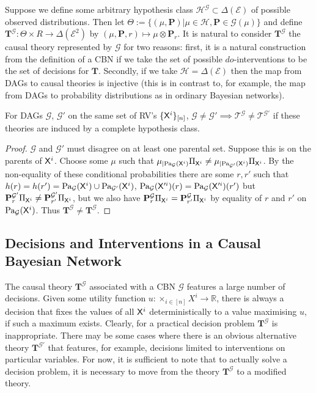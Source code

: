 Suppose we define some arbitrary hypothesis class $\mathscr{H}^{\mathcal{G}}\subset\Delta(\mathcal{E})$ of possible observed distributions. Then let $\Theta:=\{(\mu,\mathbf{P})|\mu\in\mathscr{H},\mathbf{P}\in \mathcal{G}(\mu)\}$ and define $\mathbf{T}^\mathscr{G}:\Theta\times R \to \Delta(\mathcal{E}^2)$ by $(\mu,\mathbf{P},r)\mapsto \mu\otimes \mathbf{P}_r$. It is natural to consider $\mathbf{T}^\mathscr{G}$ the causal theory represented by $\mathcal{G}$ for two reasons: first, it is a natural construction from the definition of a CBN if we take the set of possible $do$-interventions to be the set of decisions for $\mathbf{T}$. Secondly, if we take $\mathscr{H}=\Delta(\mathcal{E})$ then the map from DAGs to causal theories is injective (this is in contrast to, for example, the map from DAGs to probability distributions as in ordinary Bayesian networks\citep{bishop_pattern_2006}).

\begin{theorem}
For DAGs $\mathcal{G}$, $\mathcal{G}'$ on the same set of RV's $\{\mathsf{X}^i\}_{[n]}$, $\mathcal{G}\neq \mathcal{G}'\implies \mathscr{T}^{\mathcal{G}}\neq \mathscr{T}^{\mathcal{G}'}$ if these theories are induced by a complete hypothesis class.
\end{theorem}

\begin{proof}
$\mathcal{G}$ and $\mathcal{G}'$ must disagree on at least one parental set. Suppose this is on the parents of $\mathsf{X}^i$. Choose some $\mu$ such that $\mu_{|\text{Pa}_{\mathcal{G}}(\mathsf{X}^i)}\Pi_{\mathsf{X}^i} \neq  \mu_{|\text{Pa}_{\mathcal{G}'}(\mathsf{X}^i)}\Pi_{\mathsf{X}^i}$. By the non-equality of these conditional probabilities there are some $r,r'$ such that $h(r) = h(r') = \text{Pa}_{\mathcal{G}}(\mathsf{X}^i)\cup \text{Pa}_{\mathcal{G}'}(\mathsf{X}^i)$, $\text{Pa}_{\mathcal{G}}(\mathsf{X}'^i)(r) = \text{Pa}_{\mathcal{G}}(\mathsf{X}'^i)(r')$ but $\mathbf{P}^{\mathcal{G}'}_r \Pi_{\mathsf{X}^i} \neq \mathbf{P}^{\mathcal{G}'}_{r'} \Pi_{\mathsf{X}^i}$, but we also have $\mathbf{P}^{\mathcal{G}}_r \Pi_{\mathsf{X}^i} = \mathbf{P}^{\mathcal{G}}_{r'} \Pi_{\mathsf{X}^i}$ by equality of $r$ and $r'$ on $\text{Pa}_{\mathcal{G}}(\mathsf{X}^i)$. Thus $\mathbf{T}^\mathcal{G}\neq \mathbf{T}^\mathcal{G}$.
\end{proof}

\subsection{Decisions and Interventions in a Causal Bayesian Network}

The causal theory $\mathbf{T}^\mathcal{G}$ associated with a CBN $\mathcal{G}$ features a large number of decisions. Given some utility function $u:\times_{i\in [n]} X^i\to \mathbb{R}$, there is always a decision that fixes the values of all $\mathsf{X}^i$ deterministically to a value maximising $u$, if such a maximum exists. Clearly, for a practical decision problem $\mathbf{T}^\mathcal{G}$ is inappropriate. There may be some cases where there is an obvious alternative theory $\mathbf{T}^\mathcal{G\prime}$ that features, for example, decisions limited to interventions on particular variables. For now, it is sufficient to note that to actually solve a decision problem, it is necessary to move from the theory $\mathbf{T}^\mathcal{G}$ to a modified theory.
